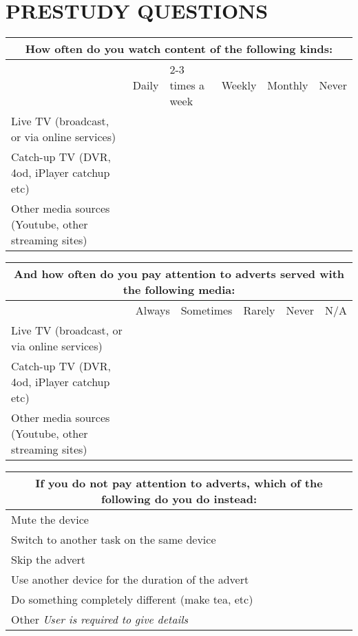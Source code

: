 \section{PRESTUDY QUESTIONS}
	\label{sec:prestudy_questions}

	\begin{tabularx}{\linewidth}{X X X X X X}
		\toprule
		\multicolumn{6}{c}{\textbf{How often do you watch content of the following kinds:}} \\
		\midrule
		& Daily & 2-3 times a week & Weekly & Monthly & Never \\
		Live TV (broadcast, or via online services) & & & & & \\
		Catch-up TV (DVR, 4od, iPlayer catchup etc) & & & & & \\
		Other media sources (Youtube, other streaming sites) & & & & & \\
		\bottomrule
	\end{tabularx}

	\begin{tabularx}{\linewidth}{X X X X X X}
		\toprule
		\multicolumn{6}{c}{\textbf{And how often do you pay attention to adverts served with the following media:}} \\
		\midrule
		& Always & Sometimes & Rarely & Never & N/A \\
		Live TV (broadcast, or via online services) & & & & & \\
		Catch-up TV (DVR, 4od, iPlayer catchup etc) & & & & & \\
		Other media sources (Youtube, other streaming sites) & & & & & \\
		\bottomrule
	\end{tabularx}

	\begin{tabularx}{\linewidth}{X X}
		\toprule
		\multicolumn{2}{c}{\textbf{If you do not pay attention to adverts, which of the following do you do instead:}} \\
		\midrule
		Mute the device & \\
		Switch to another task on the same device & \\
		Skip the advert & \\
		Use another device for the duration of the advert & \\
		Do something completely different (make tea, etc) & \\
		Other \textit{User is required to give details} & \\
		\bottomrule
	\end{tabularx}

